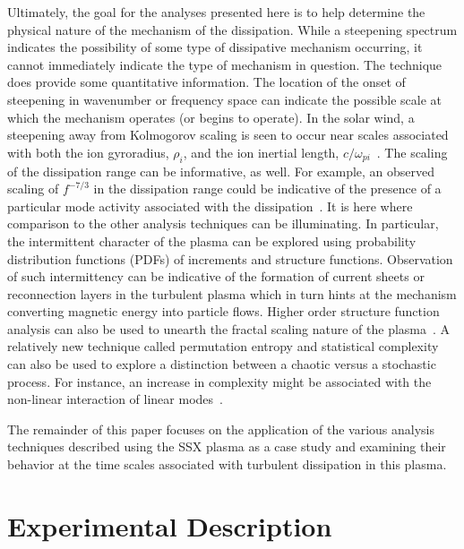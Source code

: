 \documentclass[aip,pop,amsmath,amssymb,preprint,superscriptaddress]{revtex4-1} %
\begin{document}
Ultimately, the goal for the analyses presented here is to help determine the physical nature of the mechanism of the dissipation. While a steepening spectrum indicates the possibility of some type of dissipative mechanism occurring, it cannot immediately indicate the type of mechanism in question. The technique does provide some quantitative information. The location of the onset of steepening in wavenumber or frequency space can indicate the possible scale at which the mechanism operates (or begins to operate). In the solar wind, a steepening away from Kolmogorov scaling is seen to occur near scales associated with both the ion gyroradius, $\rho_{i}$, and the ion inertial length, $c/\omega_{pi}$~\cite{chen2014}. The scaling of the dissipation range can be informative, as well. For example, an observed scaling of $f^{-7/3}$ in the dissipation range could be indicative of the presence of a particular mode activity associated with the dissipation~\cite{shaikh2009}. It is here where comparison to the other analysis techniques can be illuminating. In particular, the intermittent character of the plasma can be explored using probability distribution functions (PDFs) of increments and structure functions. Observation of such intermittency can be indicative of the formation of current sheets or reconnection layers in the turbulent plasma which in turn hints at the mechanism converting magnetic energy into particle flows. Higher order structure function analysis can also be used to unearth the fractal scaling nature of the plasma~\cite{schaffner2015}. A relatively new technique called permutation entropy and statistical complexity~\cite{rosso2007} can also be used to explore a distinction between a chaotic versus a stochastic process. For instance, an increase in complexity might be associated with the non-linear interaction of linear modes~\cite{maggs2013,maggs2015}.

The remainder of this paper focuses on the application of the various analysis techniques described using the SSX plasma as a case study and examining their behavior at the time scales associated with turbulent dissipation in this plasma.

\section{Experimental Description}
\end{document}
